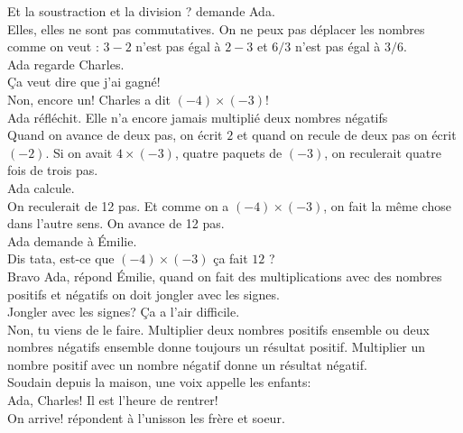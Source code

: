 \mdash Et la soustraction et la division ? demande Ada.\\
\mdash Elles, elles ne sont pas commutatives. On ne peux pas déplacer les nombres comme on veut : $3 - 2$ n'est pas égal à $2 - 3$ et $6/3$ n'est pas égal à $3/6$. \guillemotright\\
Ada regarde Charles.\\
\guillemotleft Ça veut dire que j'ai gagné!\\
\mdash Non, encore un! Charles a dit $(-4) \times (-3)$!\guillemotright\\
Ada réfléchit. Elle n'a encore jamais multiplié deux nombres négatifs\\
\guillemotleft Quand on avance de deux pas, on écrit $2$ et quand on recule de deux pas on écrit $(-2)$. Si on avait $4 \times (-3)$, quatre paquets de $(-3)$, on reculerait quatre fois de trois pas.\guillemotright\\
Ada calcule. \\
\guillemotleft On reculerait de 12 pas. Et comme on a $(-4) \times (-3)$, on fait la même chose dans l'autre sens. On avance de 12 pas.\guillemotright\\
Ada demande à Émilie.\\
\guillemotleft Dis tata, est-ce que $(-4) \times (-3)$ ça fait $12$ ?\\
\mdash Bravo Ada, répond Émilie, quand on fait des multiplications avec des nombres positifs et négatifs on doit jongler avec les signes.\\
\mdash Jongler avec les signes? Ça a l'air difficile.\\
\mdash Non, tu viens de le faire. Multiplier deux nombres positifs ensemble ou deux nombres négatifs ensemble donne toujours un résultat positif. Multiplier un nombre positif avec un nombre négatif donne un résultat négatif.\guillemotright\\
Soudain depuis la maison, une voix appelle les enfants:\\
\guillemotleft Ada, Charles! Il est l'heure de rentrer!\\
\mdash On arrive! répondent à l'unisson les frère et soeur.\guillemotright\\